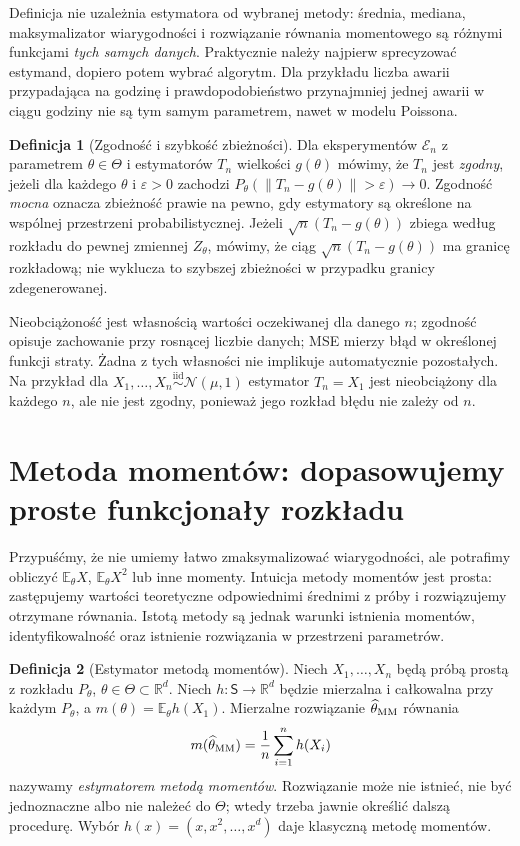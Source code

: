 \documentclass[11pt,a4paper,oneside]{report}
\numberwithin{equation}{chapter}
\theoremstyle{plain}
\theoremstyle{definition}
\newtheorem{definicja}{Definicja}[chapter]
\theoremstyle{remark}
\newcommand{\R}{\mathbb R}
\newcommand{\E}{\mathbb E}
\newcommand{\Normal}{\mathcal N}
\newcommand{\iid}{\mathrel{\overset{\mathrm{iid}}\sim}}
\begin{document}
Definicja nie uzależnia estymatora od wybranej metody: średnia,
mediana, maksymalizator wiarygodności i rozwiązanie równania
momentowego są różnymi funkcjami \emph{tych samych danych}.
Praktycznie należy najpierw sprecyzować estymand, dopiero potem
wybrać algorytm. Dla przykładu liczba awarii przypadająca na godzinę
i prawdopodobieństwo przynajmniej jednej awarii w ciągu godziny
nie są tym samym parametrem, nawet w modelu Poissona.

\begin{definicja}[Zgodność i szybkość zbieżności]\label{def:est-consistency}
Dla eksperymentów $\mathcal E_n$ z parametrem $\theta\in\Theta$
i estymatorów $T_n$ wielkości $g(\theta)$ mówimy, że
$T_n$ jest \emph{zgodny}, jeżeli dla każdego $\theta$ i $\varepsilon>0$
zachodzi $P_\theta(\|T_n-g(\theta)\|>\varepsilon)\to0$.
Zgodność \emph{mocna} oznacza zbieżność prawie na pewno, gdy
estymatory są określone na wspólnej przestrzeni probabilistycznej.
Jeżeli $\sqrt n(T_n-g(\theta))$ zbiega według rozkładu do pewnej
zmiennej $Z_\theta$, mówimy, że ciąg $\sqrt n(T_n-g(\theta))$ ma granicę rozkładową; nie wyklucza to szybszej zbieżności w przypadku granicy zdegenerowanej.
\end{definicja}

Nieobciążoność jest własnością wartości oczekiwanej dla danego $n$;
zgodność opisuje zachowanie przy rosnącej liczbie danych; MSE
mierzy błąd w określonej funkcji straty. Żadna z tych własności
nie implikuje automatycznie pozostałych. Na przykład dla
$X_1,\ldots,X_n\iid\Normal(\mu,1)$ estymator $T_n=X_1$
jest nieobciążony dla każdego $n$, ale nie jest zgodny, ponieważ
jego rozkład błędu nie zależy od $n$.

\section{Metoda momentów: dopasowujemy proste funkcjonały rozkładu}
\label{sec:moments-method}
Przypuśćmy, że nie umiemy łatwo zmaksymalizować wiarygodności,
ale potrafimy obliczyć $\E_\theta X$, $\E_\theta X^2$ lub inne
momenty. Intuicja metody momentów jest prosta: zastępujemy
wartości teoretyczne odpowiednimi średnimi z próby i rozwiązujemy
otrzymane równania. Istotą metody są jednak warunki istnienia momentów,
identyfikowalność oraz istnienie rozwiązania w przestrzeni parametrów.

\begin{definicja}[Estymator metodą momentów]\label{def:mom}
Niech $X_1,\ldots,X_n$ będą próbą prostą z rozkładu $P_\theta$,
$\theta\in\Theta\subset\R^d$. Niech
$h:\mathsf S\to\R^d$ będzie mierzalna i całkowalna przy każdym
$P_\theta$, a $m(\theta)=\E_\theta h(X_1)$.
Mierzalne rozwiązanie $\widehat\theta_{\rm MM}$ równania
\[
m(\widehat\theta_{\rm MM})=\frac1n\sum_{i=1}^n h(X_i)
\]
nazywamy \emph{estymatorem metodą momentów}.
Rozwiązanie może nie istnieć, nie być jednoznaczne albo nie należeć
do $\Theta$; wtedy trzeba jawnie określić dalszą procedurę.
Wybór $h(x)=(x,x^2,\ldots,x^d)$ daje klasyczną metodę momentów.
\end{definicja}
\end{document}
